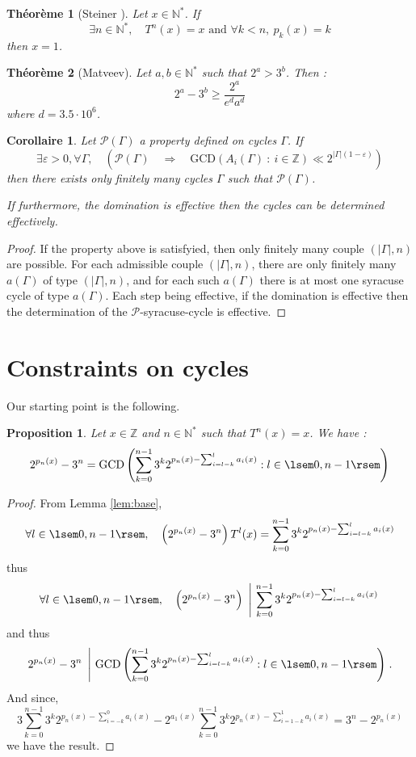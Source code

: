 \documentclass[12pt,a4paper]{article}
\newtheorem{cor}[lem]{Corollaire}
\newtheorem{prop}[lem]{Proposition}
\newtheorem{theo}{Théorème}
\def\NN{\mathbb{N}}
\def\ZZ{\mathbb{Z}}
\begin{document}
\begin{theo}[Steiner \cite{}]\label{theo:steiner} Let $x\in \NN^*$. 
If 
$$\exists n\in\NN^*,\quad T^n(x)=x \text{~and~} \forall k< n,~p_k(x)=k$$
then $x=1$.
\end{theo}

\begin{theo}[Matveev]\label{theo:matveev} Let $a,b\in \NN^*$ such that $2^a>3^b$.
 Then :
 $$2^a-3^b \geq \frac{2^a}{e^da^d} $$
 where $d = 3.5\cdot 10^6$.
\end{theo}
\begin{cor}\label{cor:property_defined_cycles_gcd} Let $\mathcal P(\Gamma)$ a property defined on cycles $\Gamma$. If
$$\exists \varepsilon>0,\forall \Gamma, \quad \left(\mathcal P(\Gamma)\quad\Rightarrow \quad \mathrm{GCD}(A_i(\Gamma)~:~ i\in \ZZ) \ll  2^{|\Gamma|(1-\varepsilon)}\right) $$ then there exists only finitely many cycles $\Gamma$ such that $\mathcal P(\Gamma)$.

If furthermore, the domination is effective then the cycles can be determined effectively.
\end{cor}
\begin{proof}
 If the property above is satisfyied, then only finitely many couple $(|\Gamma|,n)$ are possible. For each admissible couple $(|\Gamma|,n)$, there are only finitely many $a(\Gamma)$ of type $(|\Gamma|,n)$, and for each such $a(\Gamma)$ there is at most one syracuse cycle of type $a(\Gamma)$. Each step being effective, if the domination is effective then the determination of the $\mathcal P$-syracuse-cycle  is effective.
\end{proof}
\section{Constraints on cycles}
Our starting point is the following.
\begin{prop}\label{prop:have_gcd_n__l_k} Let $x\in \ZZ$ and $n\in \NN^*$ such that $T^n(x)=x$. 
We have : 
$$ 2^{p_n(x)}-3^n = \mathrm{GCD}\left(\sum_{k=0}^{n-1}3^k 2^{p_n(x)-\sum_{i=l-k}^{l} a_i(x) } : l \in 
\lsem 0,n-1 \rsem \right) $$
\end{prop}
\begin{proof}
 From Lemma \ref{lem:base}, 
$$\forall l\in \lsem0,n-1\rsem,\quad\left( 2^{p_n(x)}-3^n\right)T^l(x) = \sum_{k=0}^{n-1}3^k 2^{p_n(x)-\sum_{i=l-k}^{l} a_i(x) }$$
thus 
$$\forall l\in \lsem0,n-1\rsem,\quad\left( 2^{p_n(x)}-3^n\right) ~\left|~ \sum_{k=0}^{n-1}3^k 2^{p_n(x)-\sum_{i=l-k}^{l} a_i(x) }\right.$$
and thus
$$2^{p_n(x)}-3^n ~\left| ~\mathrm{GCD}\left(\sum_{k=0}^{n-1}3^k 2^{p_n(x)-\sum_{i=l-k}^{l} a_i(x) } : l \in 
\lsem 0,n-1 \rsem \right)\right. 
.$$
And since, 
$$3\sum_{k=0}^{n-1}3^k 2^{p_n(x)-\sum_{i=-k}^{0} a_i(x) }-2^{a_1(x)}\sum_{k=0}^{n-1}3^k 2^{p_n(x)-\sum_{i=1-k}^{1} a_i(x) } = 3^n-2^{p_n(x)} $$
we have the result.
\end{proof}
\end{document}
